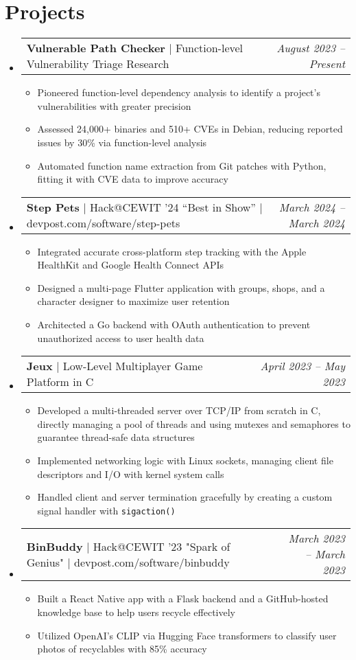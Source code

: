 \documentclass[letterpaper,11pt]{article}
\makeatletter
\newcommand{\resumeItem}[1]{
  \item\small{
    {#1 \vspace{-2pt}}
  }
}
\newcommand{\resumeProjectHeading}[2]{
    \item
    \begin{tabular*}{0.97\textwidth}{l@{\extracolsep{\fill}}r}
      \small#1 & \textit{\small #2} \\
    \end{tabular*}\vspace{-7pt}
}
\newcommand{\resumeSubHeadingListStart}{\begin{itemize}[leftmargin=0.15in, label={}]}
\newcommand{\resumeSubHeadingListEnd}{\end{itemize}}
\newcommand{\resumeItemListStart}{\begin{itemize}}
\newcommand{\resumeItemListEnd}{\end{itemize}\vspace{-5pt}}
\makeatother
\begin{document}
\section{Projects}
    \resumeSubHeadingListStart
        \resumeProjectHeading
        {\textbf{Vulnerable Path Checker} $|$ Function-level Vulnerability Triage Research}{August 2023 -- Present}
        \resumeItemListStart
            \resumeItem{Pioneered function-level dependency analysis to identify a project's vulnerabilities with greater precision}
            \resumeItem{Assessed 24,000+ binaries and 510+ CVEs in Debian, reducing reported issues by 30\% via function-level analysis}
            \resumeItem{Automated function name extraction from Git patches with Python, fitting it with CVE data to improve accuracy}
        \resumeItemListEnd

        \resumeProjectHeading
        {\textbf{Step Pets} $|$ Hack@CEWIT '24 “Best in Show” $|$ devpost.com/software/step-pets}{March 2024 -- March 2024}
        \resumeItemListStart
            \resumeItem{Integrated accurate cross-platform step tracking with the Apple HealthKit and Google Health Connect APIs}
            \resumeItem{Designed a multi-page Flutter application with groups, shops, and a character designer to maximize user retention}
            \resumeItem{Architected a Go backend with OAuth authentication to prevent unauthorized access to user health data}
        \resumeItemListEnd

        \resumeProjectHeading
        {\textbf{Jeux} $|$ Low-Level Multiplayer Game Platform in C}{April 2023 -- May 2023}
        \resumeItemListStart
            \resumeItem{Developed a multi-threaded server over TCP/IP from scratch in C, directly managing a pool of threads and using mutexes and semaphores to guarantee thread-safe data structures}
            \resumeItem{Implemented networking logic with Linux sockets, managing client file descriptors and I/O with kernel system calls}
            \resumeItem{Handled client and server termination gracefully by creating a custom signal handler with \texttt{sigaction()}}
        \resumeItemListEnd

        \resumeProjectHeading
        {\textbf{BinBuddy} $|$ Hack@CEWIT '23 "Spark of Genius" $|$ devpost.com/software/binbuddy}{March 2023 -- March 2023}
        \resumeItemListStart
            \resumeItem{Built a React Native app with a Flask backend and a GitHub-hosted knowledge base to help users recycle effectively}
            \resumeItem{Utilized OpenAI's CLIP via Hugging Face transformers to classify user photos of recyclables with 85\% accuracy}
        \resumeItemListEnd
    \resumeSubHeadingListEnd
\end{document}

